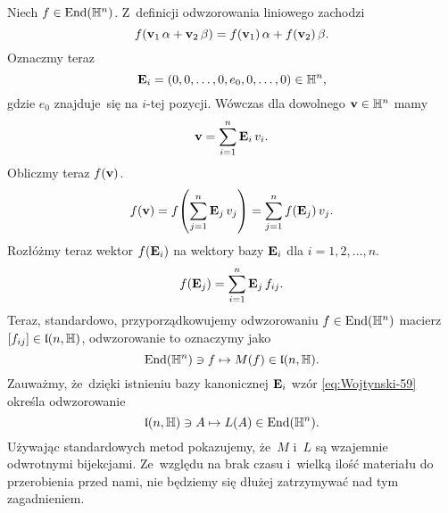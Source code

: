 \documentclass[a4paper,11pt]{article}
\begin{document}
Niech $f \in \mathrm{End}( \mathbb{H}^{ n } )$. Z~definicji odwzorowania liniowego zachodzi
\begin{equation}
  \label{eq:Wojtynski-62}
  f( \mathbf{v}_{ 1 } \, \alpha + \mathbf{v}_{ 2 } \, \beta ) =
  f( \mathbf{v}_{ 1 } ) \, \alpha + f( \mathbf{v}_{ 2 } ) \, \beta.
\end{equation}
Oznaczmy teraz
\begin{equation}
  \label{eq:Wojtynski-63}
  \mathbf{E}_{ i } = ( 0, 0, \ldots, 0, e_{ 0 }, 0, \ldots, 0 ) \in \mathbb{H}^{ n },
\end{equation}
gdzie $e_{ 0 }$ znajduje~się na $i$-tej pozycji. Wówczas dla dowolnego
$\mathbf{v} \in \mathbb{H}^{ n }$ mamy
\begin{equation}
  \label{eq:Wojtynski-64}
  \mathbf{v} = \sum_{ i = 1 }^{ n } \mathbf{E}_{ i } \, v_{ i }.
\end{equation}
Obliczmy teraz $f( \mathbf{v} )$.
\begin{equation}
  \label{eq:Wojtynski-65}
  f( \mathbf{v} ) =
  f\!\left( \sum_{ j = 1 }^{ n } \mathbf{E}_{ j } \, v_{ j } \right) =
  \sum_{ j = 1 }^{ n } f( \mathbf{E}_{ j } ) \, v_{ j }.
\end{equation}
Rozłóżmy teraz wektor $f( \mathbf{E}_{ i } )$ na wektory bazy
$\mathbf{E}_{ i }$ dla $i = 1, 2, \ldots, n$.
\begin{equation}
  \label{eq:Wojtynski-66}
  f( \mathbf{E}_{ j } ) = \sum_{ i = 1 }^{ n } \mathbf{E}_{ j } \, f_{ i j }.
\end{equation}
Teraz, standardowo, przyporządkowujemy odwzorowaniu $f \in \mathrm{End}( \mathbb{H}^{ n } )$
macierz $[ f_{ i j } ] \in \mathfrak{l}( n, \mathbb{H} )$, odwzorowanie to oznaczymy jako
\begin{equation}
  \label{eq:Wojtynski-67}
  \mathrm{End}( \mathbb{H}^{ n } ) \ni f \mapsto M( f ) \in \mathfrak{l}( n, \mathbb{H} ).
\end{equation}
Zauważmy, że~dzięki istnieniu bazy kanonicznej $\mathbf{E}_{ i }$ wzór
\eqref{eq:Wojtynski-59} określa odwzorowanie
\begin{equation}
  \label{eq:Wojtynski-68}
  \mathfrak{l}( n, \mathbb{H} ) \ni A \mapsto L( A ) \in \mathrm{End}( \mathbb{H}^{ n } ).
\end{equation}
Używając standardowych metod pokazujemy, że~$M$ i~$L$ są wzajemnie
odwrotnymi bijekcjami. Ze~względu na brak czasu i~wielką ilość materiału do
przerobienia przed nami, nie będziemy się dłużej zatrzymywać nad tym
zagadnieniem.
\end{document}
